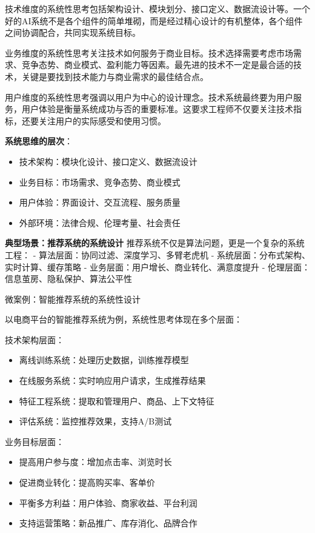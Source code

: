 技术维度的系统性思考包括架构设计、模块划分、接口定义、数据流设计等。一个好的AI系统不是各个组件的简单堆砌，而是经过精心设计的有机整体，各个组件之间协调配合，共同实现系统目标。

业务维度的系统性思考关注技术如何服务于商业目标。技术选择需要考虑市场需求、竞争态势、商业模式、盈利能力等因素。最先进的技术不一定是最合适的技术，关键是要找到技术能力与商业需求的最佳结合点。

用户维度的系统性思考强调以用户为中心的设计理念。技术系统最终要为用户服务，用户体验是衡量系统成功与否的重要标准。这要求工程师不仅要关注技术指标，还要关注用户的实际感受和使用习惯。

 \textbf{系统思维的层次}：
 \begin{itemize}
 \item 技术架构：模块化设计、接口定义、数据流设计
 \item 业务目标：市场需求、竞争态势、商业模式
 \item 用户体验：界面设计、交互流程、服务质量
 \item 外部环境：法律合规、伦理考量、社会责任
 \end{itemize}

\textbf{典型场景：推荐系统的系统设计}
推荐系统不仅是算法问题，更是一个复杂的系统工程：
- 算法层面：协同过滤、深度学习、多臂老虎机
- 系统层面：分布式架构、实时计算、缓存策略
- 业务层面：用户增长、商业转化、满意度提升
- 伦理层面：信息茧房、隐私保护、算法公平性

微案例：智能推荐系统的系统性设计

以电商平台的智能推荐系统为例，系统性思考体现在多个层面：

技术架构层面：
\begin{itemize}
\item 离线训练系统：处理历史数据，训练推荐模型
\item 在线服务系统：实时响应用户请求，生成推荐结果
\item 特征工程系统：提取和管理用户、商品、上下文特征
\item 评估系统：监控推荐效果，支持A/B测试
\end{itemize}

业务目标层面：
\begin{itemize}
\item 提高用户参与度：增加点击率、浏览时长
\item 促进商业转化：提高购买率、客单价
\item 平衡多方利益：用户体验、商家收益、平台利润
\item 支持运营策略：新品推广、库存消化、品牌合作
\end{itemize}

